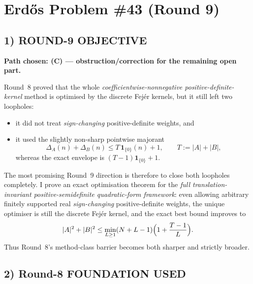 \section{Erd\H{o}s Problem \#43 (Round 9)}

\subsection{1) ROUND-9 OBJECTIVE}

\textbf{Path chosen: (C) --- obstruction/correction for the remaining open part.}

Round~8 proved that the whole \emph{coefficientwise-nonnegative positive-definite-kernel} method is optimised by the discrete Fej\'er kernels, but it still left two loopholes:
\begin{itemize}
\item it did not treat \emph{sign-changing} positive-definite weights, and
\item it used the slightly non-sharp pointwise majorant
\[
\Delta_A(n)+\Delta_B(n)\le T\,\mathbf 1_{\{0\}}(n)+1,
\qquad T:=|A|+|B|,
\]
whereas the exact envelope is \((T-1)\mathbf 1_{\{0\}}+1\).
\end{itemize}

The most promising Round~9 direction is therefore to close both loopholes completely.  I prove an exact optimisation theorem for the \emph{full translation-invariant positive-semidefinite quadratic-form framework}: even allowing arbitrary finitely supported real \emph{sign-changing} positive-definite weights, the unique optimiser is still the discrete Fej\'er kernel, and the exact best bound improves to
\[
|A|^2+|B|^2
\le
\min_{L\ge 1}(N+L-1)\Bigl(1+\frac{T-1}{L}\Bigr).
\]
Thus Round~8's method-class barrier becomes both sharper and strictly broader.

\subsection{2) Round-8 FOUNDATION USED}

